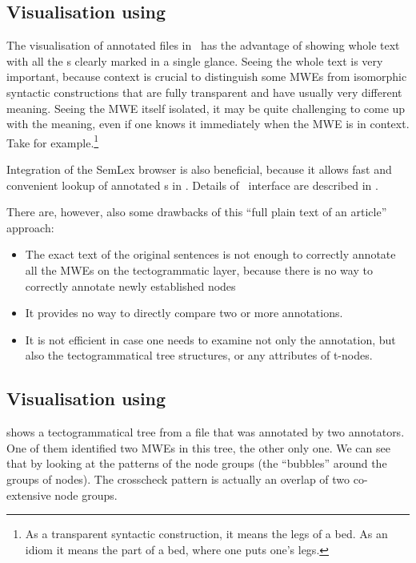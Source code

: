 \subsection{Visualisation using \seman}
The visualisation of annotated files in \seman\ has the advantage of showing whole text with all the \mwe{}s clearly marked in a single glance. Seeing the whole text is very important, because context is crucial to distinguish some MWEs from isomorphic syntactic constructions that are fully transparent and have usually very different meaning. Seeing the MWE itself isolated, it may be quite challenging to come up with the meaning, even if one knows it immediately when the MWE is in context. Take  for example.\footnote{As a transparent syntactic construction, it means the legs of a bed. As an idiom it means the part of a bed, where one puts one's legs.} 

Integration of the SemLex browser is also beneficial, because it allows fast and convenient lookup of annotated \mwe{}s in \seman. Details of \seman\ interface are described in . 

There are, however, also some drawbacks of this ``full plain text of an article'' approach: 
\begin{itemize}
\item The exact text of the original sentences is not enough to correctly annotate all the MWEs on the tectogrammatic layer, because there is no way to correctly annotate newly established nodes \see{} \todo
\item It provides no way to directly compare two or more annotations. 
\item It is not efficient in case one needs to examine not only the annotation, but also the tectogrammatical tree structures, or any attributes of t-nodes.
\end{itemize}



\subsection{Visualisation using \tred}

 shows a tectogrammatical tree from a file that was annotated by two annotators. One of them identified two MWEs in this tree, the other only one. We can see that by looking at the patterns of the node groups (the ``bubbles'' around the groups of nodes). The crosscheck pattern is actually an overlap of two co-extensive node groups.

